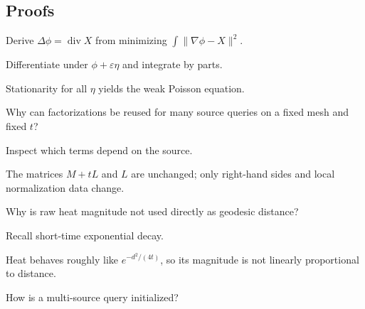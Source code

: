 \subsection*{Proofs}

\begin{exercise}\label{exr:vii40-ped-06}
Derive \(\Delta\phi=\operatorname{div}X\) from minimizing \(\int\|\nabla\phi-X\|^2\).
\end{exercise}

\begin{hint}
Differentiate under \(\phi+\varepsilon\eta\) and integrate by parts.
\end{hint}

\begin{solution}
Stationarity for all \(\eta\) yields the weak Poisson equation.
\end{solution}

\begin{exercise}\label{exr:vii40-ped-07}
Why can factorizations be reused for many source queries on a fixed mesh and fixed \(t\)?
\end{exercise}

\begin{hint}
Inspect which terms depend on the source.
\end{hint}

\begin{solution}
The matrices \(M+tL\) and \(L\) are unchanged; only right-hand sides and local normalization data change.
\end{solution}

\begin{exercise}\label{exr:vii40-ped-08}
Why is raw heat magnitude not used directly as geodesic distance?
\end{exercise}

\begin{hint}
Recall short-time exponential decay.
\end{hint}

\begin{solution}
Heat behaves roughly like \(e^{-d^2/(4t)}\), so its magnitude is not linearly proportional to distance.
\end{solution}

\begin{exercise}\label{exr:vii40-ped-09}
How is a multi-source query initialized?
\end{exercise}


